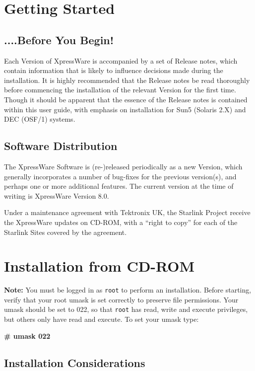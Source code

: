 \documentclass[11pt]{article}
\begin{document}
\section {Getting Started}


\subsection {....Before You Begin!}

Each Version of XpressWare is accompanied by a set of Release notes, which
contain information that is likely to influence decisions made during the
installation. It is highly recommended that the Release notes be read thoroughly
before commencing the installation of the relevant Version for the first time.
Though it should be apparent that the essence of the Release notes is contained
within this user guide, with emphasis on installation for Sun5 (Solaris 2.X)
and DEC (OSF/1) systems.


\subsection {Software Distribution}

The XpressWare Software is (re-)released periodically as a new Version, which
generally incorporates a number of bug-fixes for the previous version(s), and
perhaps one or more additional features. The current version at the time of
writing is XpressWare Version 8.0.

Under a maintenance agreement with Tektronix UK, the Starlink Project receive
the XpressWare updates on CD-ROM, with a ``right to copy'' for each of the
Starlink Sites covered by the agreement.


\section {Installation from CD-ROM}

{\bf Note:} You must be logged in as {\tt root} to perform an installation.
Before starting, verify that your root umask is set correctly to preserve file
permissions. Your umask should be set to 022, so that {\tt root} has read,
write and execute privileges, but others only have read and execute. To set your
umask type:

{\bf \# umask 022}


\subsection {Installation Considerations}
\end{document}

